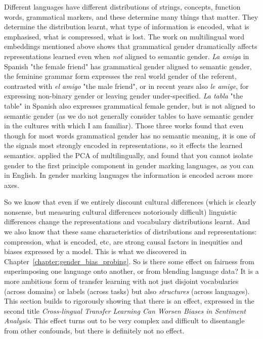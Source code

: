 Different languages have different distributions of strings, concepts, function words, grammatical markers, and these determine many things that matter. They determine the distribution learnt, what type of information is encoded, what is emphasised, what is compressed, what is lost. The work on multilingual word embeddings mentioned above \citep{gonen-etal-2019-grammatical, zhou-etal-2019-examining, McCurdy2017GrammaticalGA} shows that grammatical gender dramatically affects representations learned even when \textit{not} aligned to semantic gender. \textit{La amiga} in Spanish "the female friend" has grammatical gender aligned to semantic gender, the feminine grammar form expresses the real world gender of the referent, contrasted with \textit{el amigo} "the male friend", or in recent years also \textit{le amige}, for expressing non-binary gender or leaving gender under-specified. \textit{La tabla} "the table" in Spanish also expresses grammatical female gender, but is not aligned to semantic gender (as we do not generally consider tables to have semantic gender in the cultures with which I am familiar)\citep{corbett_non_canonical, corbett_1991}. Those three works found that even though for most words grammatical gender has no semantic meaning, it is one of the signals most strongly encoded in representations, so it effects the learned semantics. \citet{gonen-etal-2022-analyzing} applied the PCA of \citet{bolukbasi} multilingually, and found that you cannot isolate gender to the first principle component in gender marking languages, as you can in English. In gender marking languages the information is encoded across more axes.

So we know that even if we entirely discount cultural differences (which is clearly nonsense, but measuring cultural differences notoriously difficult) %
linguistic differences change the representations and vocabulary distributions learnt. And we also know that these same characteristics of distributions and representations: compression, what is encoded, etc, are strong causal factors in inequities and biases expressed by a model. This is what we discovered in Chapter~\ref{chapter:gender_bias_probing}.  So is there some effect on fairness from superimposing one language onto another, or from blending language data? It is a more ambitious form of transfer learning with not just disjoint vocabularies (across domains) or labels (across tasks) but also \textit{structures} (across languages). This section builds to rigorously showing that there is an effect, expressed in the second title \textit{Cross-lingual Transfer Learning Can Worsen Biases in Sentiment Analysis}. This effect turns out to be very complex and difficult to disentangle from other confounds, but there is definitely not no effect. 

